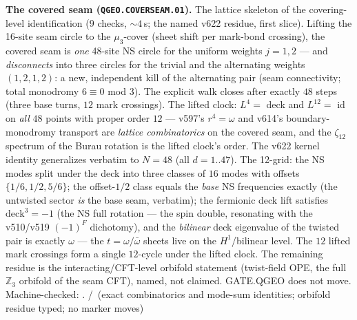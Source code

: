 \par\smallskip\noindent\textbf{The covered seam
(\texttt{QGEO.COVERSEAM.01}).}
The lattice skeleton of the covering-level identification ($9$
checks, ${\sim}4$\,s; the named v622 residue, first slice).
Lifting the 16-site seam circle to the $\mu_3$-cover (sheet shift
per mark-bond crossing), the covered seam is \emph{one} 48-site NS
circle for the uniform weights $j=1,2$ --- and \emph{disconnects}
into three circles for the trivial and the alternating weights
$(1,2,1,2)$: a new, independent kill of the alternating pair (seam
connectivity; total monodromy $6\equiv0$ mod $3$).  The explicit
walk closes after exactly $48$ steps (three base turns, $12$ mark
crossings).  The lifted clock: $L^4=$ deck and $L^{12}=$ id on
\emph{all} $48$ points with proper order $12$ --- v597's
$r^4=\omega$ and v614's boundary-monodromy transport are
\emph{lattice combinatorics} on the covered seam, and the
$\zeta_{12}$ spectrum of the Burau rotation is the lifted clock's
order.  The v622 kernel identity generalizes verbatim to $N=48$
(all $d=1..47$).  The 12-grid: the NS modes split under the deck
into three classes of $16$ modes with offsets $\{1/6,1/2,5/6\}$; the
offset-$1/2$ class equals the \emph{base} NS frequencies exactly
(the untwisted sector \emph{is} the base seam, verbatim); the
fermionic deck lift satisfies $\mathrm{deck}^3=-1$ (the NS full
rotation --- the spin double, resonating with the v510/v519
$(-1)^F$ dichotomy), and the \emph{bilinear} deck eigenvalue of the
twisted pair is exactly $\omega$ --- the $t=\omega/\bar\omega$
sheets live on the $H^1$/bilinear level.  The $12$ lifted mark
crossings form a single $12$-cycle under the lifted clock.  The
remaining residue is the interacting/CFT-level orbifold statement
(twist-field OPE, the full $\mathbb{Z}_3$ orbifold of the seam CFT),
named, not claimed.  GATE.QGEO does not move.
Machine-checked: .
\mE/\mC\ (exact combinatorics and mode-sum identities; orbifold
residue typed; no marker moves)
\par\smallskip


